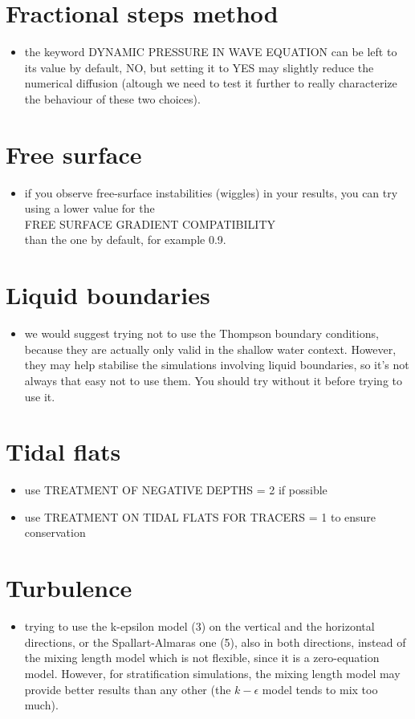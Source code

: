 \section{Fractional steps method}
\begin{itemize}
\item the keyword DYNAMIC PRESSURE IN WAVE EQUATION can be left to its value by default, NO, but setting it to YES may slightly reduce the numerical diffusion (altough we need to test it further to really characterize the behaviour of these two choices).
\end{itemize}

\section{Free surface}
\begin{itemize}
\item if you observe free-surface instabilities (wiggles) in your results, you can try using a lower value for the\\
FREE SURFACE GRADIENT COMPATIBILITY\\
than the one by default, for example 0.9.
\end{itemize}

\section{Liquid boundaries}
\begin{itemize}
\item we would suggest trying not to use the Thompson boundary conditions, because they are actually only valid in the shallow water context.
  However, they may help stabilise the simulations involving liquid boundaries, so it's not always that easy not to use them. You should try without it before trying to use it.
\end{itemize}

\section{Tidal flats}
\begin{itemize}
\item use TREATMENT OF NEGATIVE DEPTHS = 2 if possible
\item use TREATMENT ON TIDAL FLATS FOR TRACERS = 1 to ensure conservation
\end{itemize}

\section{Turbulence}
\begin{itemize}
\item trying to use the k-epsilon model (3) on the vertical and the horizontal directions, or the Spallart-Almaras one (5), also in both directions,
  instead of the mixing length model which is not flexible, since it is a zero-equation model. However, for stratification simulations, the mixing length model
  may provide better results than any other (the $k-\epsilon$ model tends to mix too much).
\end{itemize}

